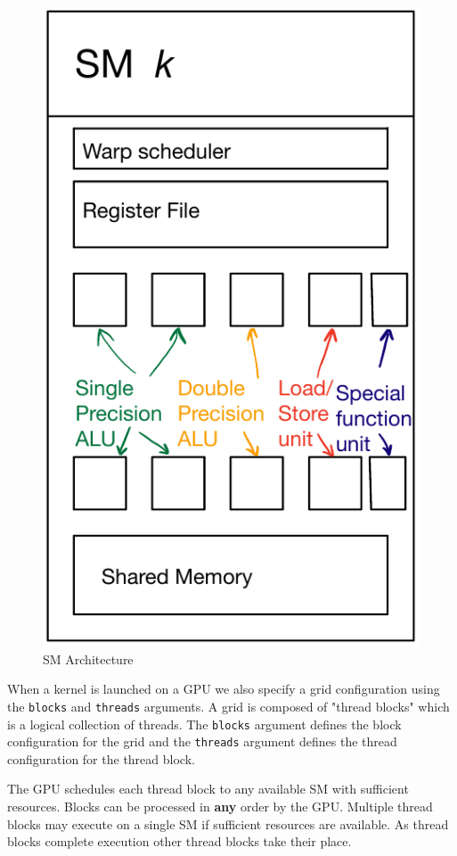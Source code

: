 \documentclass[12pt,a4paper]{article}
\begin{document}
\begin{figure}
\centering
\includegraphics{./assets/SM_diagram.png}
\caption{SM Architecture}
\end{figure}


When a kernel is launched on a GPU we also specify a grid configuration using  the \texttt{blocks} and \texttt{threads} arguments. A grid is composed of "thread blocks" which is a logical collection of threads. The \texttt{blocks} argument defines the block configuration for the grid and the \texttt{threads} argument defines the thread configuration for the thread block.

The GPU schedules each thread block to any available SM with sufficient resources. Blocks can be processed in \textbf{any} order by the GPU. Multiple thread blocks may execute on a single SM if sufficient resources are available. As thread blocks complete execution other thread blocks take their place.
\end{document}
